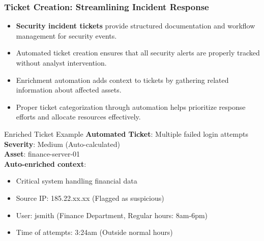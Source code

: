 \documentclass{beamer}
\begin{document}
\begin{frame}
  \frametitle{Ticket Creation: Streamlining Incident Response}
  
  \begin{itemize}
    \item \textbf{Security incident tickets} provide structured documentation and workflow management for security events.
    \item Automated ticket creation ensures that all security alerts are properly tracked without analyst intervention.
    \item Enrichment automation adds context to tickets by gathering related information about affected assets.
    \item Proper ticket categorization through automation helps prioritize response efforts and allocate resources effectively.
  \end{itemize}
  
  \begin{exampleblock}{Enriched Ticket Example}
    \tiny
    \textbf{Automated Ticket}: Multiple failed login attempts \\
    \textbf{Severity}: Medium (Auto-calculated) \\
    \textbf{Asset}: finance-server-01 \\
    \textbf{Auto-enriched context}:
    \begin{itemize}
      \item Critical system handling financial data
      \item Source IP: 185.22.xx.xx (Flagged as suspicious)
      \item User: jsmith (Finance Department, Regular hours: 8am-6pm)
      \item Time of attempts: 3:24am (Outside normal hours)
    \end{itemize}
  \end{exampleblock}
\end{frame}
\end{document}
